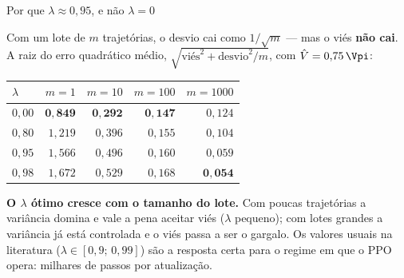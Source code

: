 \documentclass[aspectratio=169, 10pt]{beamer}
\newcommand{\Vhat}{\hat{V}}
\begin{document}
\begin{frame}{Por que $\lambda \approx 0{,}95$, e não $\lambda = 0$}

  Com um lote de $m$ trajetórias, o desvio cai como $1/\sqrt{m}$ --- mas o viés
  \textbf{não cai}. A raiz do erro quadrático médio,
  $\sqrt{\text{viés}^2 + \text{desvio}^2/m}$, com $\Vhat = 0{,}75\,\Vpi$:

  \begin{center}\small
  \begin{tabular}{@{}lrrrr@{}}
    \toprule
    $\lambda$ & $m=1$ & $m=10$ & $m=100$ & $m=1000$\\
    \midrule
    $0{,}00$ & $\mathbf{0{,}849}$ & $\mathbf{0{,}292}$ & $\mathbf{0{,}147}$ & $0{,}124$\\
    $0{,}80$ & $1{,}219$ & $0{,}396$ & $0{,}155$ & $0{,}104$\\
    $0{,}95$ & $1{,}566$ & $0{,}496$ & $0{,}160$ & $0{,}059$\\
    $0{,}98$ & $1{,}672$ & $0{,}529$ & $0{,}168$ & $\mathbf{0{,}054}$\\
    \bottomrule
  \end{tabular}
  \end{center}

  \begin{ideiabox}
    \textbf{O $\lambda$ ótimo cresce com o tamanho do lote.} Com poucas trajetórias a
    variância domina e vale a pena aceitar viés ($\lambda$ pequeno); com lotes
    grandes a variância já está controlada e o viés passa a ser o gargalo. Os
    valores usuais na literatura ($\lambda \in [0{,}9;\,0{,}99]$) são a resposta certa
    para o regime em que o PPO opera: milhares de passos por atualização.
  \end{ideiabox}
\end{frame}
\end{document}
